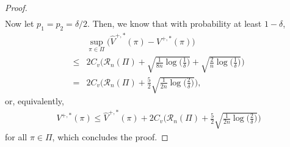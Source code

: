\documentclass{article} %
\theoremstyle{plain}
\theoremstyle{definition}
\theoremstyle{remark}
\begin{document}
\begin{proof}
\begin{align}
\end{align}
Now let $p_1 = p_2 = \delta/2$. Then, we know that with probability at least $1-\delta$,
\begin{align}
    &\sup_{\pi \in \Pi} \Big( \hat{V}^{+,*}(\pi) -V^{+,*}(\pi) \Big) \\
    \leq& 2 C_v \Big(  \mathcal{R}_n(\Pi) + \sqrt{\frac{1}{8n}\log\Big( \frac{1}{\delta}\Big)} + \sqrt{\frac{2}{n} \log \Big( \frac{1}{\delta} \Big) }\Big)\\
    =& 2C_v \Big( \mathcal{R}_n(\Pi) + \frac{5}{2}\sqrt{\frac{1}{2n}\log\Big(\frac{2}{\delta}\Big)}\Big),
\end{align}
or, equivalently,
\begin{align}
    V^{+,*}(\pi) \leq \hat{V}^{+,*}(\pi) + 2C_v \Big( \mathcal{R}_n(\Pi) + \frac{5}{2}\sqrt{\frac{1}{2n}\log\Big(\frac{2}{\delta}\Big)}\Big)
\end{align}
for all $\pi\in \Pi$, which concludes the proof.
\end{proof}
\clearpage


\end{document}
